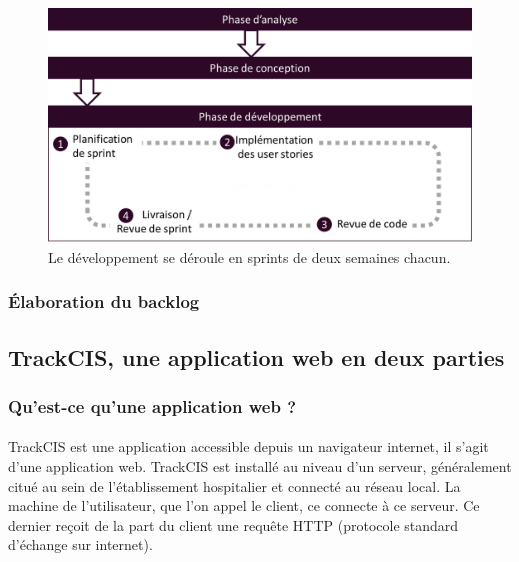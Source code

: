 			\begin{figure}[H]%
				\centering
				\includegraphics[width=15cm]{../img/part3/methodo_dev.png}
				\caption{\label{methodo_dev} Le développement se déroule en sprints de
				deux semaines chacun.}
			\end{figure}
		
		\subsubsection{Élaboration du backlog}
	
	\subsection{TrackCIS, une application web en deux parties}
		
		\subsubsection{Qu'est-ce qu'une application web ?}
			\paragraph{}%
			TrackCIS est une application accessible depuis un navigateur internet, il
			s'agit d'une application web. TrackCIS est installé au niveau d'un serveur,
			généralement citué au sein de l'établissement hospitalier et connecté au
			réseau local. La machine de l'utilisateur, que l'on appel le client, ce
			connecte à ce serveur. Ce dernier reçoit de la part du client une requête
			HTTP (protocole standard d'échange sur internet).
			
			\paragraph{}%
			
